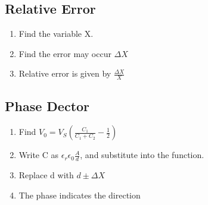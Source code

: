 \documentclass{article}
\begin{document}
	\subsection{Relative Error}
	\begin{enumerate}
		\item Find the variable X.
		\item Find the error may occur $\Delta X$
		\item Relative error is given by $\frac{\Delta X}{X}$ 
	\end{enumerate}    
	
	\subsection{Phase Dector}
	\begin{enumerate}
		\item Find $V_0 = V_S(\frac{C_1}{C_1 + C_2} - \frac{1}{2})$
		\item Write C as $\epsilon_r\epsilon_0 \frac{A}{d}$, and substitute into the function.
		\item Replace d with $d \pm \Delta X$
		\item The phase indicates the direction
	\end{enumerate}
	
	
\end{document}
